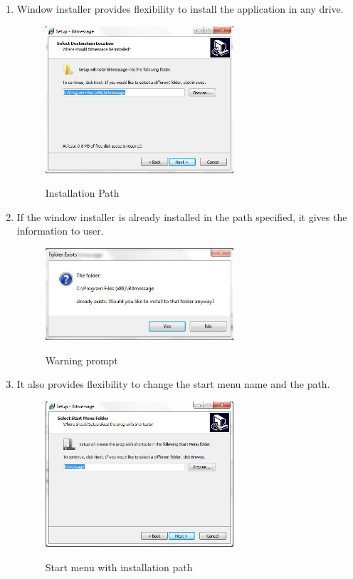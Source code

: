 \documentclass[12pt]{article}
\begin{document}
\begin{enumerate}
\begin{enumerate}
\item Window installer provides flexibility to install the application in any drive.\\
\begin{figure}[H]
\begin{center}
    {\label{fig:1} \includegraphics[width=7cm, keepaspectratio]{SE1.jpg}}   
  \centering  \caption{ Installation Path}
  \end{center}
\end{figure}

\item If the window installer is already installed in the path specified, it gives the information to user. 
\begin{figure}[H]
\begin{center}
    {\label{fig:1} \includegraphics[width=7cm, keepaspectratio]{SE2.jpg}}   
  \centering  \caption{ Warning prompt}
  \end{center}
\end{figure}

\item It also provides flexibility to change the start menu name and the path. 
\begin{figure}[H]
\begin{center}
    {\label{fig:1} \includegraphics[width=7cm, keepaspectratio]{SE3.jpg}}   
  \centering  \caption{Start menu with installation path}
  \end{center}
\end{figure}




\end{enumerate}
\end{enumerate}
\end{document}
